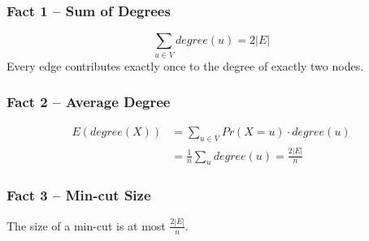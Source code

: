 \begin{frame}
  \frametitle{Fact 1 -- Sum of Degrees}
{ \Huge
  \[
    \sum_{u\in V} degree(u) = 2|E|
  \]
}
  Every edge contributes exactly once to the degree of exactly two nodes.
\end{frame}

\begin{frame}
  \frametitle{Fact 2 -- Average Degree}
\begin{equation}
\begin{aligned}
E(degree(X)) & = \sum_{u\in V} Pr(X=u)\cdot degree(u)\\
              & = \frac{1}{n} \sum_u degree(u) = \frac{2|E|}{n}
  \end{aligned}
  \end{equation}
\end{frame}

\begin{frame}
  \frametitle{Fact 3 -- Min-cut Size}

  The size of a min-cut is at most $\frac{2|E|}{n}$.


\end{frame}

